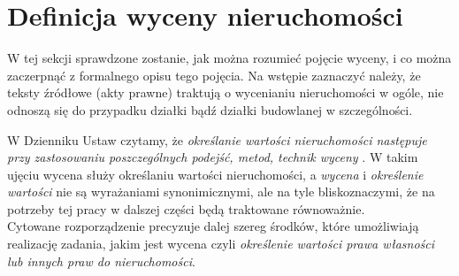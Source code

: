 \documentclass[a4paper,12pt,twoside,openany]{report}
\begin{document}
\section{Definicja wyceny nieruchomości}
W tej sekcji sprawdzone zostanie, jak można rozumieć pojęcie wyceny, i co można zaczerpnąć z formalnego opisu tego pojęcia. Na wstępie zaznaczyć należy, że teksty źródłowe (akty prawne) traktują  o wycenianiu nieruchomości w ogóle, nie odnoszą się do przypadku działki bądź działki budowlanej w szczególności.


W Dzienniku Ustaw czytamy, że \textit{określanie wartości nieruchomości następuje przy zastosowaniu poszczególnych podejść, metod, technik wyceny} \cite{OPRM}. W takim ujęciu wycena służy określaniu wartości nieruchomości, a \textit{wycena} i \textit{określenie wartości} nie są wyrażaniami synonimicznymi, ale na tyle bliskoznaczymi, że na potrzeby tej pracy w dalszej części będą traktowane równoważnie.\\
Cytowane rozporządzenie precyzuje dalej szereg środków, które umożliwiają realizację zadania, jakim jest wycena czyli \textit {określenie wartości prawa własności lub innych praw do nieruchomości}.
\end{document}
